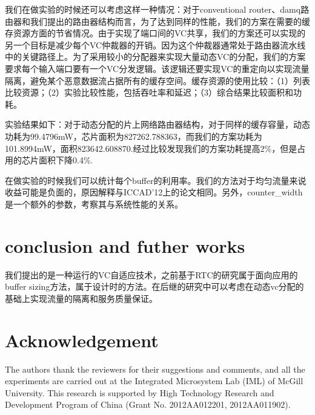 ﻿\documentclass[10pt,journal]{IEEEtran}
\begin{document}
我们在做实验的时候还可以考虑这样一种情况：对于conventional router、damq路由器和我们提出的路由器结构而言，为了达到同样的性能，我们的方案在需要的缓存资源方面的节省情况。由于实现了端口间的VC共享，我们的方案还可以实现的另一个目标是减少每个VC仲裁器的开销。因为这个仲裁器通常处于路由器流水线中的关键路径上。为了采用较小的分配器来实现大量动态VC的分配，我们的方案要求每个输入端口要有一个VC分发逻辑。该逻辑还要实现VC的重定向以实现流量隔离，避免某个恶意数据流占据所有的缓存空间。缓存资源的使用比较：（1）列表比较资源；（2）实验比较性能，包括吞吐率和延迟；（3）综合结果比较面积和功耗。

实验结果如下：对于动态分配的片上网络路由器结构，对于同样的缓存容量，动态功耗为99.4796mW，芯片面积为827262.788363，而我们的方案功耗为101.8994mW，面积823642.608870.经过比较发现我们的方案功耗提高2\%，但是占用的芯片面积下降0.4\%.

在做实验的时候我们可以统计每个buffer的利用率。我们的方法对于均匀流量来说收益可能是负面的，原因解释与ICCAD'12上的论文相同。另外，counter\_width是一个额外的参数，考察其与系统性能的关系。

\section{conclusion and futher works}\label{conc}
我们提出的是一种运行的VC自适应技术，之前基于RTC的研究属于面向应用的buffer sizing方法，属于设计时的方法。在后继的研究中可以考虑在动态vc分配的基础上实现流量的隔离和服务质量保证。

\section*{Acknowledgement}
The authors thank the reviewers for their suggestions and comments, and all the experiments are carried out at the Integrated Microsystem Lab (IML) of McGill University. This research is supported by High Technology Research and Development Program of China (Grant No. 2012AA012201, 2012AA011902).



\end{document}
